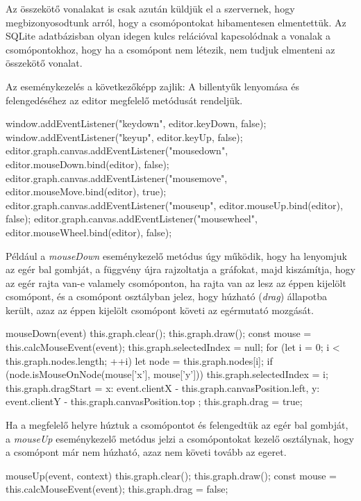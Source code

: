 Az összekötő vonalakat is csak azután küldjük el a szervernek, hogy megbizonyosodtunk arról, hogy a csomópontokat hibamentesen elmentettük. Az SQLite adatbázisban olyan idegen kulcs relációval kapcsolódnak a vonalak a csomópontokhoz, hogy ha a csomópont nem létezik, nem tudjuk elmenteni az összekötő vonalat.
 
Az eseménykezelés a következőképp zajlik: A billentyűk lenyomása és felengedéséhez az editor megfelelő metódusát rendeljük.

\begin{javascript}
window.addEventListener("keydown", editor.keyDown, false);
window.addEventListener("keyup", editor.keyUp, false);
editor.graph.canvas.addEventListener("mousedown", editor.mouseDown.bind(editor), false);
editor.graph.canvas.addEventListener("mousemove", editor.mouseMove.bind(editor), true);
editor.graph.canvas.addEventListener("mouseup", editor.mouseUp.bind(editor), false);
editor.graph.canvas.addEventListener("mousewheel", editor.mouseWheel.bind(editor), false);
\end{javascript}
 
Például a \textit{mouseDown} eseménykezelő metódus úgy működik, hogy ha lenyomjuk az egér bal gombját, a függvény újra rajzoltatja a gráfokat, majd kiszámítja, hogy az egér rajta van-e valamely csomóponton, ha rajta van az lesz az éppen kijelölt csomópont, és a csomópont osztályban jelez, hogy húzható (\textit{drag}) állapotba került, azaz az éppen kijelölt csomópont követi az egérmutató mozgását.

\begin{javascript}
mouseDown(event)
{
   this.graph.clear();
   this.graph.draw();
   const mouse = this.calcMouseEvent(event);
   this.graph.selectedIndex = null;
   for (let i = 0; i < this.graph.nodes.length; ++i) {
       let node = this.graph.nodes[i];
       if (node.isMouseOnNode(mouse['x'], mouse['y'])){
           this.graph.selectedIndex = i;
       }
   }
   this.graph.dragStart = {
       x: event.clientX - this.graph.canvasPosition.left,
       y: event.clientY - this.graph.canvasPosition.top
   };
   this.graph.drag = true;
}
\end{javascript}

 
Ha a megfelelő helyre húztuk a csomópontot és felengedtük az egér bal gombját, a \textit{mouseUp} eseménykezelő metódus jelzi a csomópontokat kezelő osztálynak, hogy a csomópont már nem húzható, azaz nem követi tovább az egeret.

\begin{javascript}
mouseUp(event, context)
{
   this.graph.clear();
   this.graph.draw();
   const mouse = this.calcMouseEvent(event);
   this.graph.drag = false;
}
\end{javascript}

